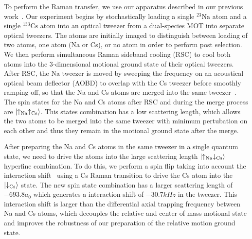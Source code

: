 \documentclass[aps,prl,twocolumn,superscriptaddress]{revtex4-1}
\newcommand{\todo}[1]{}
\begin{document}
To perform the Raman transfer, we use our apparatus described in our previous work~\cite{Liu2019}. Our experiment begins by stochastically loading a single ${}^{23}\mathrm{Na}$ atom and a single ${}^{133}\mathrm{Cs}$ atom into an optical tweezer from a dual-species MOT\todo{cite na loading paper} into separate optical tweezers. The atoms are initially imaged to distinguish between loading of two atoms, one atom (Na or Cs), or no atom in order to perform post selection. We then perform simultaneous Raman sideband cooling (RSC) to cool both atoms into the 3-dimensional motional ground state of their optical tweezers. After RSC, the Na tweezer is moved by sweeping the frequency on an acoustical optical beam deflector (AOBD) to overlap with the Cs tweezer before smoothly ramping off, so that the Na and Cs atoms are merged into the same tweezer~\cite{Liu2019}. The spin states for the Na and Cs atoms after RSC and during the merge process are $\ket{\uparrow_{\text{Na}}\uparrow_{\text{Cs}}} $. This states combination has a low scattering length, which allows the two atoms to be merged into the same tweezer with minimum pertubation on each other and thus they remain in the motional ground state after the merge.

After preparing the Na and Cs atoms in the same tweezer in a single quantum state, we need to drive the atoms into the large scattering length $\ket{\uparrow_{\text{Na}} \downarrow_{\text{Cs}}}$ hyperfine combination. To do this, we perform a spin flip taking into account the interaction shift~\cite{Hood2019} using a Cs Raman transition to drive the Cs atom into the $\ket{\downarrow_{\text{Cs}}}$ state. The new spin state combination has a larger scattering length of $-693.8 a_0$ which generates a interaction shift of $-30.7 kHz$ in the tweezer. This interaction shift is larger than the differential axial trapping frequency between Na and Cs atoms, which decouples the relative and center of mass motional state and improves the robustness of our preparation of the relative motion ground state.

\end{document}
